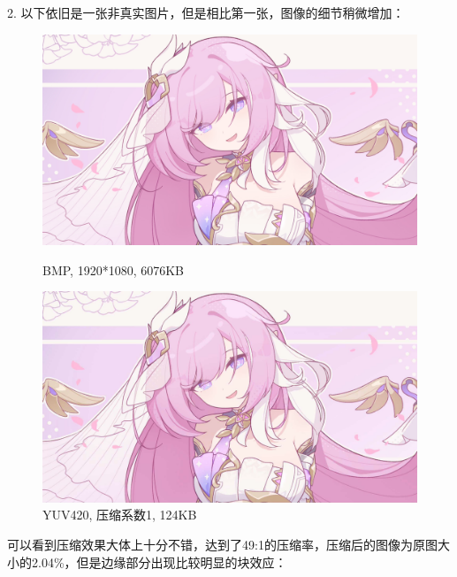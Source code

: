 \documentclass{article}
\begin{document}
2. 以下依旧是一张非真实图片，但是相比第一张，图像的细节稍微增加：
\FloatBarrier
\begin{figure}[htbp]
    \centering
    \begin{minipage}[t]{0.45\textwidth}
        \centering
        \includegraphics[width=\textwidth]{assets/Test2.png}
        \caption{BMP, 1920*1080, 6076KB}
    \end{minipage}
    \hfill  %
    \begin{minipage}[t]{0.45\textwidth}
        \centering
        \includegraphics[width=\textwidth]{assets/Test2_420.png}
        \caption{YUV420, 压缩系数1, 124KB}
    \end{minipage}
\end{figure}
\FloatBarrier
可以看到压缩效果大体上十分不错，达到了49:1的压缩率，压缩后的图像为原图大小的2.04\%，但是边缘部分出现比较明显的块效应：
\end{document}
